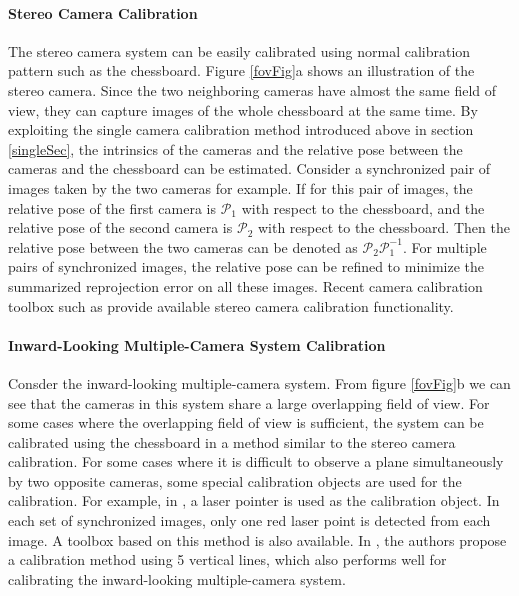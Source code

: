 \documentclass{report}
\begin{document}
\paragraph{Stereo Camera Calibration} 
The stereo camera system can be easily calibrated using normal calibration pattern such as the chessboard. Figure \ref{fovFig}a shows an illustration of the stereo camera. Since the two neighboring cameras have almost the same field of view, they can capture images of the whole chessboard at the same time. By exploiting the single camera calibration method introduced above in section \ref{singleSec}, the intrinsics of the cameras and the relative pose between the cameras and the chessboard can be estimated. Consider a synchronized pair of images taken by the two cameras for example. If for this pair of images, the relative pose of the first camera is $\mathcal{P}_1$ with respect to the chessboard, and the relative pose of the second camera is $\mathcal{P}_2$ with respect to the chessboard. Then the relative pose between the two cameras can be denoted as $\mathcal{P}_2 \mathcal{P}_1^{-1}$. For multiple pairs of synchronized images, the relative pose can be refined to minimize the summarized reprojection error on all these images. Recent camera calibration toolbox such as \cite{bouguet2004camera, opencv_library} provide available stereo camera calibration functionality. 

\paragraph{Inward-Looking Multiple-Camera System Calibration }
Consder the inward-looking multiple-camera system. From figure \ref{fovFig}b we can see that the cameras in this system share a large overlapping field of view. For some cases where the overlapping field of view is sufficient, the system can be calibrated using the chessboard in a method similar to the stereo camera calibration. For some cases where it is difficult to observe a plane simultaneously by two opposite cameras, some special calibration objects are used for the calibration. For example, in \cite{svoboda2005convenient}, a laser pointer is used as the calibration object. In each set of synchronized images, only one red laser point is detected from each image. A toolbox based on this method is also available. In \cite{kong2013camera}, the authors propose a calibration method using 5 vertical lines, which also performs well for calibrating the inward-looking multiple-camera system. 
\end{document}
